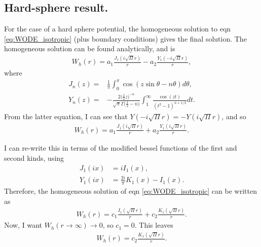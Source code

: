 \documentclass[twocolumn,amsmath,amssymb,aps]{revtex4-1}%
\begin{document}
\subsection{Hard-sphere result.}
For the case of a hard sphere potential, the homogeneous solution to eqn
\ref{eq:WODE_isotropic} (plus boundary conditions) gives the final solution.
The homogeneous solution can be found analytically, and is
\begin{align}
  W_h(r)=a_1\frac{J_1(i\sqrt{\Pi}r)}{r}-a_2\frac{Y_1(-i\sqrt{\Pi}r)}{r},
\end{align}
where
\begin{align}
  J_n(z) =& \frac{1}{\pi}\int_0^{\pi}\cos(z\sin\theta-n\theta)d\theta,\\
  Y_n(z) =& -\frac{2\bigg(\frac{1}{2}z\bigg)^{-n}}{\sqrt{\pi}
    \Gamma\bigg(\frac{1}{2}-n\bigg)}
  \int_1^{\infty}\frac{\cos(zt)}{(t^2-1)^{n+1/2}}dt.
\end{align}
From the latter equation, I can see that $Y(-i\sqrt{\Pi}r)=-Y(i\sqrt{\Pi}r)$,
and so
\begin{align}
  W_h(r)=a_1\frac{J_1(i\sqrt{\Pi}r)}{r}+a_2\frac{Y_1(i\sqrt{\Pi}r)}{r}.
\end{align}

I can re-write this in terms of the modified bessel functions of the first and
second kinds, using
\begin{align}
  J_1(ix) &= i I_1(x),\\
  Y_1(ix) &= \frac{2i}{\pi}K_1(x)-I_1(x).
\end{align}
Therefore, the homogeneous solution of eqn \ref{eq:WODE_isotropic} can be
written as
\begin{align}
  W_h(r) = c_1\frac{I_1(\sqrt{\Pi}r)}{r} + c_2\frac{K_1(\sqrt{\Pi}r)}{r}.
\end{align}
Now, I want $W_h(r\to\infty)\to0$, so $c_1=0$. This leaves
\begin{align}\label{eq:Whomo}
  W_h(r) = c_2\frac{K_1(\sqrt{\Pi}r)}{r}.
\end{align}
  


\begin{comment}
The second option is to say that, within the sum over the index $k$ in eqn
\ref{eq:WODE_exact}, the terms are essentially averaging out to zero unless
$k=j$, so
\begin{align}
  \bm{r}_{ik}\cdot\bm{u}_{ij}&\approx\delta_{jk}\bm{r}_{ik}\cdot\bm{u}_{ij},\\
  \bm{r}_{ik}\cdot\bm{r}_{ik}&\approx\delta_{jk}\bm{r}_{ik}\cdot\bm{r}_{ij}.
\end{align}
Inserting this approximation into eqn \ref{eq:WODE_exact} then yields
\begin{align}
  W''(r)+W'(r)\bigg(\frac{3}{r}-\mathcal{V}'(r)\bigg)-\bigg(\Pi
  + \frac{\mathcal{V}'(r)}{r}\bigg) W(r)+\frac{\mathcal{V}'(r)}{2r}=0.
\end{align}
\end{comment}
\end{document}

